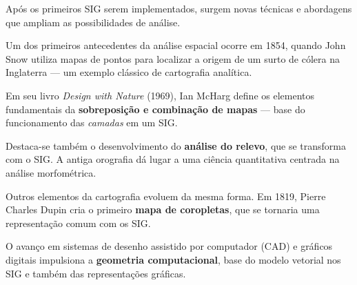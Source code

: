 Após os primeiros SIG serem implementados, surgem novas técnicas e abordagens que ampliam as possibilidades de análise.

Um dos primeiros antecedentes da análise espacial ocorre em 1854, quando John Snow utiliza mapas de pontos para localizar a origem de um surto de cólera na Inglaterra — um exemplo clássico de cartografia analítica.

Em seu livro \emph{Design with Nature} (1969), Ian McHarg define os elementos fundamentais da \textbf{sobreposição e combinação de mapas} — base do funcionamento das \emph{camadas} em um SIG.

Destaca-se também o desenvolvimento do \textbf{análise do relevo}, que se transforma com o SIG. A antiga orografia dá lugar a uma ciência quantitativa centrada na análise morfométrica.

Outros elementos da cartografia evoluem da mesma forma. Em 1819, Pierre Charles Dupin cria o primeiro \textbf{mapa de coropletas}, que se tornaria uma representação comum com os SIG.

O avanço em sistemas de desenho assistido por computador (CAD) e gráficos digitais impulsiona a \textbf{geometria computacional}, base do modelo vetorial nos SIG e também das representações gráficas.

\pagestyle{empty}
